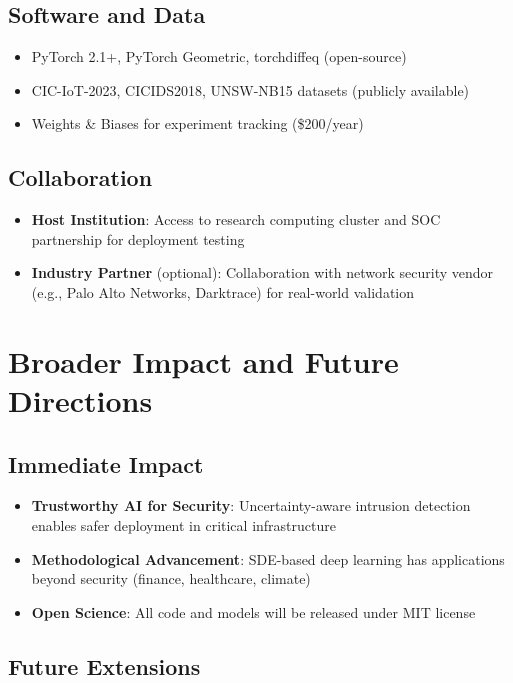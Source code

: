 \documentclass[11pt]{article}
\begin{document}
\subsection{Software and Data}

\begin{itemize}
    \item PyTorch 2.1+, PyTorch Geometric, torchdiffeq (open-source)
    \item CIC-IoT-2023, CICIDS2018, UNSW-NB15 datasets (publicly available)
    \item Weights \& Biases for experiment tracking (\$200/year)
\end{itemize}

\subsection{Collaboration}

\begin{itemize}
    \item \textbf{Host Institution}: Access to research computing cluster and SOC partnership for deployment testing
    \item \textbf{Industry Partner} (optional): Collaboration with network security vendor (e.g., Palo Alto Networks, Darktrace) for real-world validation
\end{itemize}

\section{Broader Impact and Future Directions}

\subsection{Immediate Impact}

\begin{itemize}
    \item \textbf{Trustworthy AI for Security}: Uncertainty-aware intrusion detection enables safer deployment in critical infrastructure
    \item \textbf{Methodological Advancement}: SDE-based deep learning has applications beyond security (finance, healthcare, climate)
    \item \textbf{Open Science}: All code and models will be released under MIT license
\end{itemize}

\subsection{Future Extensions}
\end{document}
